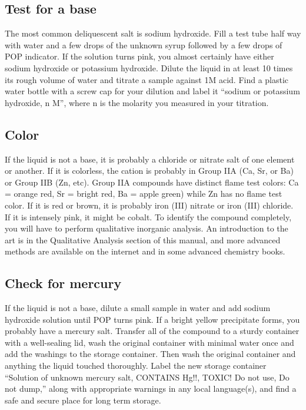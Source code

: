 \subsection{Test for a base}
The most common deliquescent salt is sodium hydroxide. 
Fill a test tube half way with water 
and a few drops of the unknown syrup 
followed by a few drops of POP indicator. 
If the solution turns pink, 
you almost certainly have either 
sodium hydroxide or potassium hydroxide. 
Dilute the liquid in at least 10 times its 
rough volume of water and titrate a sample against 1M acid. 
Find a plastic water bottle with a screw cap for your dilution and 
label it “sodium or potassium hydroxide, 
n M”, 
where n is the molarity you measured in your titration.

\subsection{Color}
If the liquid is not a base, 
it is probably a chloride or nitrate salt of one element or another. 
If it is colorless, 
the cation is probably in Group IIA (Ca, 
Sr, 
or Ba) or Group IIB (Zn, 
etc). 
Group IIA compounds have distinct flame test colors: Ca = orange red, 
Sr = bright red, 
Ba = apple green) while Zn has no flame test color. 
If it is red or brown, 
it is probably iron (III) nitrate or iron (III) chloride. 
If it is intensely pink, 
it might be cobalt. 
To identify the compound completely, 
you will have to perform qualitative inorganic analysis. 
An introduction to the art is 
in the Qualitative Analysis section of this manual, 
and more advanced methods are available on the internet 
and in some advanced chemistry books.

\subsection{Check for mercury}
If the liquid is not a base, 
dilute a small sample in water 
and add sodium hydroxide solution until POP turns pink. 
If a bright yellow precipitate forms, 
you probably have a mercury salt. 
Transfer all of the compound to a sturdy container 
with a well-sealing lid, 
wash the original container with minimal water once 
and add the washings to the storage container. 
Then wash the original container 
and anything the liquid touched thoroughly. 
Label the new storage container “Solution of unknown mercury salt, 
CONTAINS Hg!!, 
TOXIC! Do not use, 
Do not dump,” along with appropriate warnings in any local language(s), 
and find a safe and secure place for long term storage.


